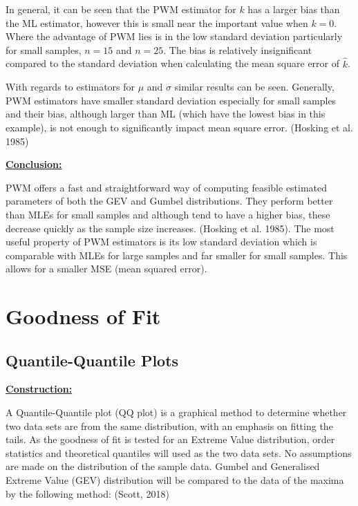 \documentclass{article}
\begin{document}
In general, it can be seen that the PWM estimator for $k$ has a larger bias than the ML estimator, however this is small near the important value when $k=0$. Where the advantage of PWM lies is in the low standard deviation particularly for small samples, $n=15$ and $n=25$. The bias is relatively insignificant compared to the standard deviation when calculating the mean square error of $\hat{k}$.

With regards to estimators for $\mu$ and $\sigma$ similar results can be seen. Generally, PWM estimators have smaller standard deviation especially for small samples and their bias, although larger than ML (which have the lowest bias in this example), is not enough to significantly impact mean square error. (Hosking et al. 1985)

\underline{\textbf{Conclusion:}}

PWM offers  a fast and straightforward way of computing feasible estimated parameters of both the GEV and Gumbel distributions. They perform better than MLEs for small samples and although tend to have a higher bias, these decrease quickly as the sample size increases. (Hosking et al. 1985). The most useful property of PWM estimators is its low standard deviation which is comparable with MLEs for large samples and far smaller for small samples. This allows for a smaller MSE (mean squared error).


\newpage

\section{Goodness of Fit}
\subsection{Quantile-Quantile Plots}
\underline{\textbf{Construction:}}

A Quantile-Quantile plot (QQ plot) is a graphical method to determine whether two data sets are from the same distribution, with an emphasis on fitting the tails. As the goodness of fit is tested for an Extreme Value distribution, order statistics and theoretical quantiles will used as the two data sets. No assumptions are made on the distribution of the sample data. Gumbel and Generalised Extreme Value (GEV) distribution will be compared to the data of the maxima by the following method: (Scott, 2018)
\end{document}
